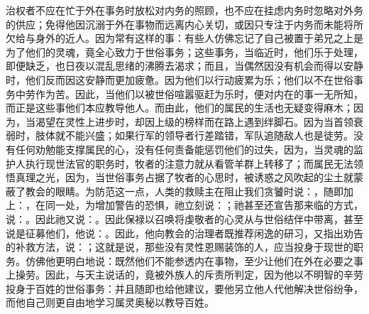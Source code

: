 治权者不应在忙于外在事务时放松对内务的照顾，也不应在挂虑内务时忽略对外务的供应；免得他因沉溺于外在事物而远离内心关切，或因只专注于内务而未能将所欠给与身外的近人。因为常有这样的事：有些人仿佛忘记了自己被置于弟兄之上是为了他们的灵魂，竟全心致力于世俗事务；这些事务，当临近时，他们乐于处理，即便缺乏，也日夜以混乱思绪的沸腾去渴求；而且，当偶然因没有机会而得以安静时，他们反而因这安静而更加疲惫。因为他们以行动疲累为乐；他们以不在世俗事务中劳作为苦。因此，当他们以被世俗喧嚣驱赶为乐时，便对内在的事一无所知，而正是这些事他们本应教导他人。而由此，他们的属民的生活也无疑变得麻木；因为，当渴望在灵性上进步时，却因上级的榜样而在路上遇到绊脚石。因为当首领衰弱时，肢体就不能兴盛；如果行军的领导者行差踏错，军队追随敌人也是徒劳。没有任何劝勉能支撑属民的心，没有任何责备能惩罚他们的过失，因为，当灵魂的监护人执行现世法官的职务时，牧者的注意力就从看管羊群上转移了；而属民无法领悟真理之光，因为，当世俗事务占据了牧者的心思时，被诱惑之风吹起的尘土就蒙蔽了教会的眼睛。为防范这一点，人类的救赎主在阻止我们贪饕时说：，随即加上：，在同一处，为增加警告的恐惧，祂立刻说：；祂甚至还宣告那来临的方式，说：。因此祂又说：。因此保禄以召唤将虔敬者的心灵从与世俗结伴中带离，甚至说是征募他们，他说：。因此，他向教会的治理者既推荐闲逸的研习，又指出劝告的补救方法，说：；这就是说，那些没有灵性恩赐装饰的人，应当投身于现世的职务。仿佛他更明白地说：既然他们不能参透内在事物，至少让他们在外在必要之事上操劳。因此，与天主说话的，竟被外族人的斥责所判定，因为他以不明智的辛劳投身于百姓的世俗事务：并且随即也给他建议，要他另立他人代他解决世俗纷争，而他自己则更自由地学习属灵奥秘以教导百姓。\par

